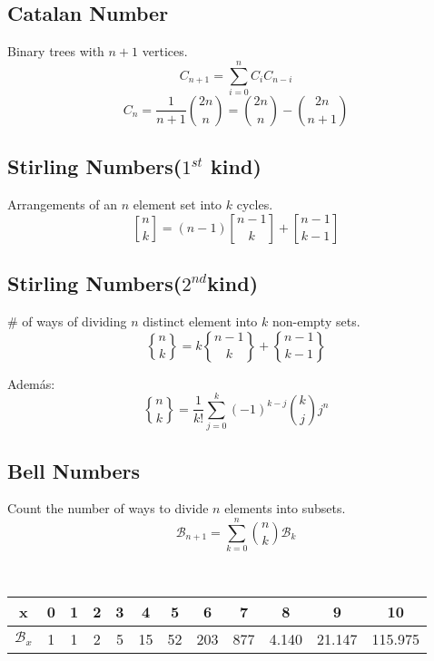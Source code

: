 \documentclass[a4paper]{amsart}
\newcommand{\stirlingfirst}[2]{\genfrac{[}{]}{0pt}{}{#1}{#2}}
\newcommand{\stirlingsecond}[2]{\genfrac{\{}{\}}{0pt}{}{#1}{#2}}
\begin{document}
    \subsection{Catalan Number}
    	Binary trees with $n+1$ vertices.
      \begin{equation*}
        C_{n+1} = \sum_{i=0}^nC_iC_{n-i}
      \end{equation*}
      \begin{equation*}
        C_n = \frac{1}{n+1}\binom{2n}{n} = \binom{2n}{n} - \binom{2n}{n+1}
      \end{equation*}
    \subsection{Stirling Numbers($1^{st}$ kind)} Arrangements of an $n$ element set into $k$ cycles.
      \begin{equation*}
        \stirlingfirst{n}{k} = (n-1)\stirlingfirst{n-1}{k} + \stirlingfirst{n-1}{k-1}
      \end{equation*}

    \subsection{Stirling Numbers($2^{nd}$kind)} \# of ways of dividing $n$ distinct element into $k$ non-empty sets.
      \begin{equation*}
        \stirlingsecond{n}{k} = k\stirlingsecond{n-1}{k} + \stirlingsecond{n-1}{k-1}
      \end{equation*}

      Además:
      \begin{equation*}
        \stirlingsecond{n}{k} = \frac{1}{k!}\sum_{j=0}^k (-1)^{k-j} \binom{k}{j} j^n
      \end{equation*}

      \subsection{Bell Numbers} Count the number of ways to divide $n$ elements into subsets.
      \begin{equation*}
        \mathcal{B}_{n+1} = \sum_{k=0}^n \binom{n}{k} \mathcal{B}_k
      \end{equation*}

      \

      \begin{tabular}{|c|c|c|c|c|c|c|c|c|c|c|c|}
        \hline
        x&0&1&2&3&4&5&6&7&8&9&10 \\ \hline %
        $\mathcal{B}_x$&1&1&2&5&15&52&203&877&4.140&21.147&115.975 \\ \hline %
      \end{tabular}
\end{document}

